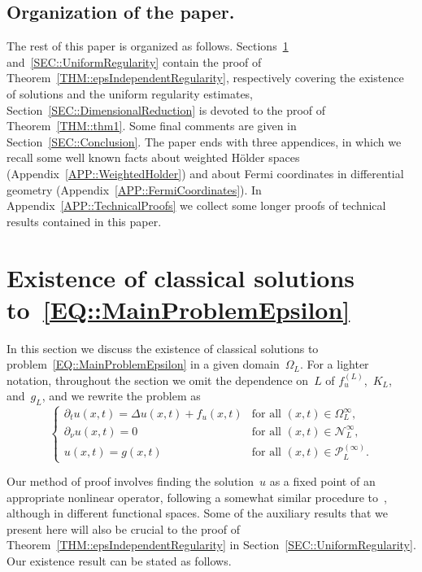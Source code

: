 \documentclass[12pt,a4paper]{amsart}
\numberwithin{equation}{section}
\theoremstyle{definition}
\theoremstyle{remark}
\begin{document}
\subsection{Organization of the paper.}

The rest of this paper is organized as follows. Sections~\ref{SEC::Existence} and~\ref{SEC::UniformRegularity} contain the proof of Theorem~\ref{THM::epsIndependentRegularity}, respectively covering the existence of solutions and the uniform regularity estimates, Section~\ref{SEC::DimensionalReduction} is devoted to the proof of Theorem~\ref{THM::thm1}. Some final comments are given in Section~\ref{SEC::Conclusion}. The paper ends with three appendices, in which we recall some well known facts about weighted Hölder spaces (Appendix~\ref{APP::WeightedHolder}) and about Fermi coordinates in differential geometry (Appendix~\ref{APP::FermiCoordinates}). In Appendix~\ref{APP::TechnicalProofs} we collect some longer proofs of technical results contained in this paper.

\section{Existence of classical solutions to~\eqref{EQ::MainProblemEpsilon}}\label{SEC::Existence}
In this section we discuss the existence of classical solutions to problem~\eqref{EQ::MainProblemEpsilon} in a given domain~$\Omega_L$. For a lighter notation, throughout the section we omit the dependence on~$L$ of $f_u^{(L)}$,~$K_L$, and~$g_L$, and we rewrite the problem as
\begin{equation}\label{EQ::MainProblem}
    \begin{cases}
        \partial_{t} u(x,t) = \Delta u(x,t) + f_u(x,t)&\text{for all }(x,t) \in \Omega_L^\infty,\\
        \partial_{\nu} u(x,t) = 0&\text{for all }(x,t) \in \mathcal{N}_L^\infty,\\
        u(x,t) = g(x,t)&\text{for all }(x,t) \in \mathcal{P}_L^{(\infty)}.
    \end{cases}
\end{equation}

Our method of proof involves finding the solution~$u$ as a fixed point of an appropriate nonlinear operator, following a somewhat similar procedure to~\cite{MR4968074}, although in different functional spaces. Some of the auxiliary results that we present here will also be crucial to the proof of Theorem~\ref{THM::epsIndependentRegularity} in Section~\ref{SEC::UniformRegularity}. Our existence result can be stated as follows.
\end{document}
